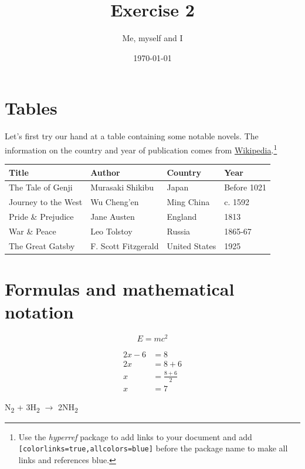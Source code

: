 \documentclass[a4paper]{article}
\title{Exercise 2}
\author{Me, myself and I}
\date{\today}
\begin{document}
\maketitle
	
\section*{Tables}

\noindent Let's first try our hand at a table containing some notable novels. The information on the country and year of publication comes from \href{https://en.wikipedia.org/wiki/Main_Page}{Wikipedia}.\footnote{Use the \textit{hyperref} package to add links to your document and add \texttt{[colorlinks=true,allcolors=blue]} before the package name to make all links and references blue.}

\begin{center}
\begin{tabular}{||l | l | l | l ||} 
 \hline
 Title & Author & Country & Year\\ [1ex] 
 \hline\hline 
 The Tale of Genji & Murasaki Shikibu & Japan & Before 1021 \\  
 \hline
 Journey to the West & Wu Cheng'en & Ming China & c. 1592 \\
 \hline
 Pride \& Prejudice & Jane Austen & England & 1813 \\ 
 \hline
 War \& Peace & Leo Tolstoy & Russia & 1865-67 \\
 \hline
  The Great Gatsby & F. Scott Fitzgerald & United States & 1925 \\
 \hline
\end{tabular}
\end{center}

\section*{Formulas and mathematical notation}
\begin{equation*}
    E = mc^2
\end{equation*}


\begin{align*} 
2x - 6 &=  8 \\ 
2x &=  8 + 6\\
  x  &= \frac{8 + 6}{2}\\
  x &= 7
\end{align*}

\begin{center}
\noindent N\textsubscript{2} + 3H\textsubscript{2} $\rightarrow$ 2NH\textsubscript{2}    
\end{center}
\end{document}
